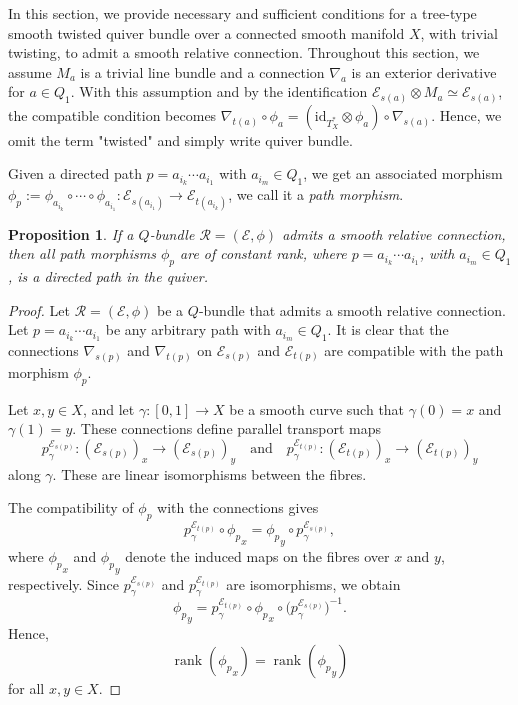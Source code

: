 \documentclass[12pt, reqno]{amsart}
\theoremstyle{plain}
\newtheorem{proposition}[theorem]{Proposition}
\numberwithin{equation}{section}
\begin{document}
In this section, we provide necessary and sufficient conditions for a tree-type smooth twisted quiver bundle over a connected smooth manifold $X$, with trivial twisting, to admit a smooth relative connection. Throughout this section, we assume $M_a$ is a trivial line bundle and a connection $\nabla_a$ is an exterior derivative for $a\in Q_1$. With this assumption and by the identification $\mathcal{E}_{s(a)}\otimes M_a \simeq \mathcal{E}_{s(a)}$, the compatible condition becomes $\nabla_{t(a)}\circ \phi_a = (\mathrm{id}_{T^*_X}\otimes \phi_a)\circ \nabla_{s(a)}$. Hence, we omit the term "twisted" and simply write quiver bundle.

Given a directed path $p=a_{i_k}  \cdots a_{i_1}$ with $a_{i_m}\in Q_1$, we get an associated morphism $\phi_p:=\phi_{a_{i_k}} \circ \cdots \circ \phi_{a_{i_1}}: \mathcal{E}_{s(a_{i_1})} \rightarrow  \mathcal{E}_{t(a_{i_k})}$, we call it a \emph{path morphism}.

\begin{proposition}\label{Constant rank}
If a $Q$-bundle $\mathcal{R} = (\mathcal{E}, \phi)$ admits a smooth relative connection, then all path morphisms $\phi_p$ are of constant rank, where 
$p = a_{i_k} \cdots a_{i_1}$, with $a_{i_m} \in Q_1$, 
is a directed path in the quiver.
\end{proposition}

\begin{proof}
Let $\mathcal{R} = (\mathcal{E}, \phi)$ be a $Q$-bundle that admits a smooth relative connection. Let $p=a_{i_k} \cdots a_{i_1}$ be any arbitrary path with $a_{i_m}\in Q_1$. It is clear that the connections $\nabla_{s(p)}$ and $\nabla_{t(p)}$ on $\mathcal{E}_{s(p)}$ and $\mathcal{E}_{t(p)}$ are compatible with the path morphism $\phi_p$. 

Let $x, y \in X$, and let $\gamma: [0,1] \to X$ be a smooth curve such that $\gamma(0)=x$ and $\gamma(1)=y$. These connections define parallel transport maps
\[
p_{\gamma}^{\mathcal{E}_{s(p)}}: (\mathcal{E}_{s(p)})_{x} \rightarrow (\mathcal{E}_{s(p)})_{y}
\quad \text{and} \quad
p_{\gamma}^{\mathcal{E}_{t(p)}}: (\mathcal{E}_{t(p)})_{x} \rightarrow (\mathcal{E}_{t(p)})_{y}
\]
along $\gamma$. These are linear isomorphisms between the fibres.

The compatibility of $\phi_p$ with the connections gives
\begin{equation*}
  p_{\gamma}^{\mathcal{E}_{t(p)}} \circ {\phi_p}_{x}
  =
  {\phi_p}_{y} \circ p_{\gamma}^{\mathcal{E}_{s(p)}},
\end{equation*}
where ${\phi_p}_x$ and ${\phi_p}_y$ denote the induced maps on the fibres over $x$ and $y$, respectively. Since $p_{\gamma}^{\mathcal{E}_{s(p)}}$ and $p_{\gamma}^{\mathcal{E}_{t(p)}}$ are isomorphisms, we obtain
\begin{equation*}
{\phi_p}_y
=
p_{\gamma}^{\mathcal{E}_{t(p)}} \circ {\phi_p}_x \circ
\big(p_{\gamma}^{\mathcal{E}_{s(p)}}\big)^{-1}.
\end{equation*}
Hence,
\[
\operatorname{rank}({\phi_p}_x)=\operatorname{rank}({\phi_p}_y)
\]
for all $x,y \in X$.
\end{proof}
\end{document}
